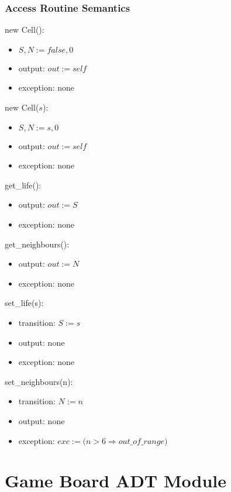 \documentclass[12pt]{article}
\begin{document}
\subsubsection* {Access Routine Semantics}

new Cell():
\begin{itemize}
    \item $S, N := false, 0$
    \item output: $\mathit{out := self}$
    \item exception: none
\end{itemize}

\noindent
new Cell($s$):
\begin{itemize}
    \item $S, N := s, 0$
    \item output: $\mathit{out := self}$
    \item exception: none
\end{itemize}

\noindent
get\_life():
\begin{itemize}
    \item output: $\mathit{out := S}$
    \item exception: none
\end{itemize}

\noindent
get\_neighbours():
\begin{itemize}
    \item output: $\mathit{out := N}$
    \item exception: none
\end{itemize}

\noindent
set\_life(s):
\begin{itemize}
    \item transition: $\mathit{S := s}$
    \item output: none
    \item exception: none
\end{itemize}

\noindent
set\_neighbours(n):
\begin{itemize}
    \item transition: $\mathit{N := n}$
    \item output: none
    \item exception: $\mathit{exc := (n > 6} \Rightarrow out\_of\_range)$
\end{itemize}

\newpage

\section* {Game Board ADT Module}
\end{document}
